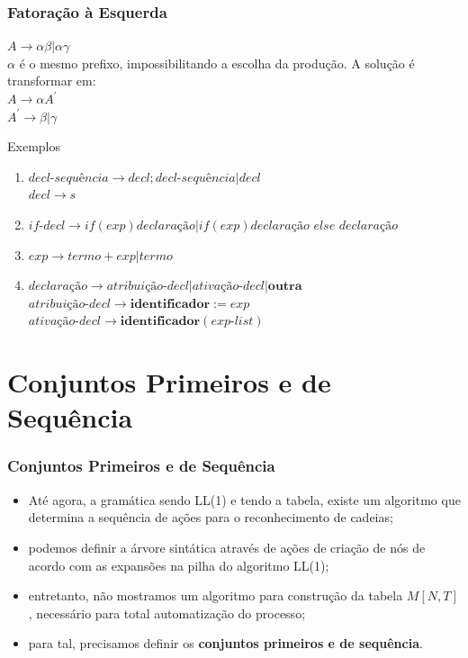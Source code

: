 \documentclass[table]{beamer}
\begin{document}
\begin{frame}
   \frametitle{Fatoração à Esquerda}
   $A \to \alpha\beta|\alpha\gamma$ \\
   $\alpha$ é o mesmo prefixo, impossibilitando a escolha da produção. A solução é transformar em: \\
   $A \to \alpha A^{'}$ \\
   $A^{'} \to \beta | \gamma$
   \begin{block}{Exemplos}
      \begin{enumerate}
         \item $\textit{decl-sequência} \to decl; \textit{decl-sequência} | decl$ \\
	 $decl \to s$
	 \item $\textit{if-decl} \to if (exp) \textit{declaração} | if (exp) \textit{declaração else  declaração}$
	 \item $exp \to termo + exp | termo $
	 \item $\textit{declaração} \to \textit{atribuição-decl} | \textit{ativação-decl} | \textbf{outra}$ \\
	 $\textit{atribuição-decl} \to \textbf{identificador} := exp$ \\
	 $\textit{ativação-decl} \to \textbf{identificador} (\textit{exp-list})$ 
      \end{enumerate}
   \end{block}
\end{frame}

\section{Conjuntos Primeiros e de Sequência}
\begin{frame}
   \frametitle{Conjuntos Primeiros e de Sequência}
   \begin{itemize}
      \item Até agora, a gramática sendo LL(1) e tendo a tabela, existe um algoritmo que determina a sequência de ações para o reconhecimento de cadeias;
      \item podemos definir a árvore sintática através de ações de criação de nós de acordo com as expansões na pilha do algoritmo LL(1);
      \item entretanto, não mostramos um algoritmo para construção da tabela $M[N,T]$, necessário para total automatização do processo;
      \item para tal, precisamos definir os \textbf{conjuntos primeiros e de sequência}.
   \end{itemize}
\end{frame}
\end{document}
